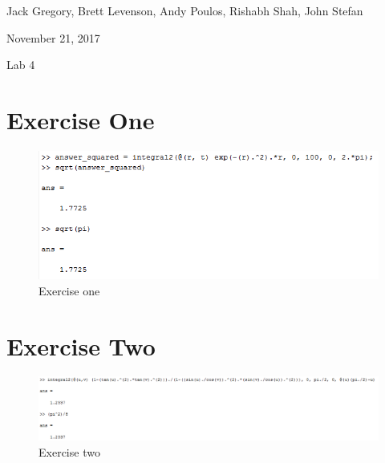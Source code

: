 \documentclass[11pt]{article}
\begin{document}
{\Large\noindent Jack Gregory, Brett Levenson, Andy Poulos, Rishabh Shah, John Stefan

\noindent November 21, 2017

\noindent Lab 4 \\}

\section*{Exercise One}
\begin{figure}[H]
	\includegraphics[width=\textwidth]{One.PNG}
	\caption*{Exercise one}
\end{figure}

\section*{Exercise Two}
\begin{figure}[H]
	\includegraphics[width=\textwidth]{Two.PNG}
	\caption*{Exercise two}
\end{figure}
\end{document}
